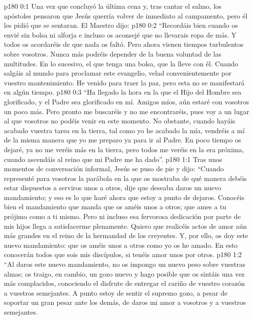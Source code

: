 \author{Comisión de seres intermedios}
\vs p180 0:1 Una vez que concluyó la última cena y, tras cantar el salmo, los apóstoles pensaron que Jesús querría volver de inmediato al campamento, pero él les pidió que se sentaran. El Maestro dijo:
\vs p180 0:2 “Recordáis bien cuando os envié sin bolsa ni alforja e incluso os aconsejé que no llevarais ropa de más. Y todos os acordaréis de que nada os faltó. Pero ahora vienen tiempos turbulentos sobre vosotros. Nunca más podréis depender de la buena voluntad de las multitudes. En lo sucesivo, el que tenga una bolsa, que la lleve con él. Cuando salgáis al mundo para proclamar este evangelio, velad convenientemente por vuestro mantenimiento. He venido para traer la paz, pero esta no se manifestará en algún tiempo.
\vs p180 0:3 “Ha llegado la hora en la que el Hijo del Hombre sea glorificado, y el Padre sea glorificado en mí. Amigos míos, aún estaré con vosotros un poco más. Pero pronto me buscaréis y no me encontraréis, pues voy a un lugar al que vosotros no podéis venir en este momento. No obstante, cuando hayáis acabado vuestra tarea en la tierra, tal como yo he acabado la mía, vendréis a mí de la misma manera que yo me preparo ya para ir al Padre. En poco tiempo os dejaré, ya no me veréis más en la tierra, pero todos me veréis en la era próxima, cuando ascendáis al reino que mi Padre me ha dado”.
\vs p180 1:1 Tras unos momentos de conversación informal, Jesús se puso de pie y dijo: “Cuando representé para vosotros la parábola en la que os mostraba de qué manera debéis estar dispuestos a serviros unos a otros, dije que deseaba daros un nuevo mandamiento; y eso es lo que haré ahora que estoy a punto de dejaros. Conocéis bien el mandamiento que manda que os améis unos a otros; que ames a tu prójimo como a ti mismo. Pero ni incluso esa fervorosa dedicación por parte de mis hijos llega a satisfacerme plenamente. Quiero que realicéis actos de amor aún más grandes en el reino de la hermandad de los creyentes. Y, por ello, os doy este nuevo mandamiento: que os améis unos a otros como yo os he amado. En esto conocerán todos que sois mis discípulos, si tenéis amor unos por otros.
\vs p180 1:2 “Al daros este nuevo mandamiento, no os impongo un nuevo peso sobre vuestras almas; os traigo, en cambio, un gozo nuevo y hago posible que os sintáis una vez más complacidos, conociendo el disfrute de entregar el cariño de vuestro corazón a vuestros semejantes. A punto estoy de sentir el supremo gozo, a pesar de soportar un gran pesar ante los demás, de daros mi amor a vosotros y a vuestros semejantes.
